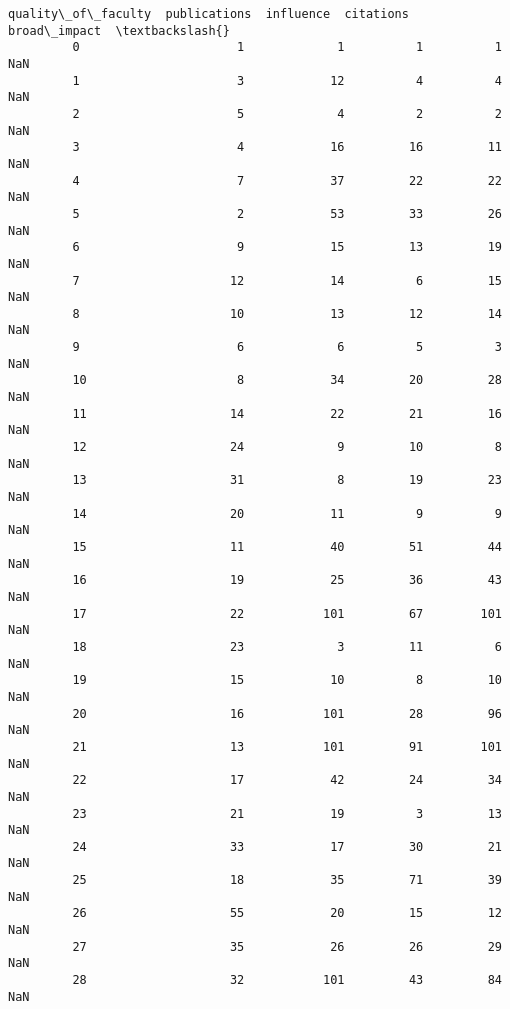 \documentclass[11pt]{article}
\begin{document}
\begin{Verbatim}[commandchars=\\\{\}]
               quality\_of\_faculty  publications  influence  citations  broad\_impact  \textbackslash{}
         0                      1             1          1          1           NaN   
         1                      3            12          4          4           NaN   
         2                      5             4          2          2           NaN   
         3                      4            16         16         11           NaN   
         4                      7            37         22         22           NaN   
         5                      2            53         33         26           NaN   
         6                      9            15         13         19           NaN   
         7                     12            14          6         15           NaN   
         8                     10            13         12         14           NaN   
         9                      6             6          5          3           NaN   
         10                     8            34         20         28           NaN   
         11                    14            22         21         16           NaN   
         12                    24             9         10          8           NaN   
         13                    31             8         19         23           NaN   
         14                    20            11          9          9           NaN   
         15                    11            40         51         44           NaN   
         16                    19            25         36         43           NaN   
         17                    22           101         67        101           NaN   
         18                    23             3         11          6           NaN   
         19                    15            10          8         10           NaN   
         20                    16           101         28         96           NaN   
         21                    13           101         91        101           NaN   
         22                    17            42         24         34           NaN   
         23                    21            19          3         13           NaN   
         24                    33            17         30         21           NaN   
         25                    18            35         71         39           NaN   
         26                    55            20         15         12           NaN   
         27                    35            26         26         29           NaN   
         28                    32           101         43         84           NaN   

\end{Verbatim}
\end{document}

